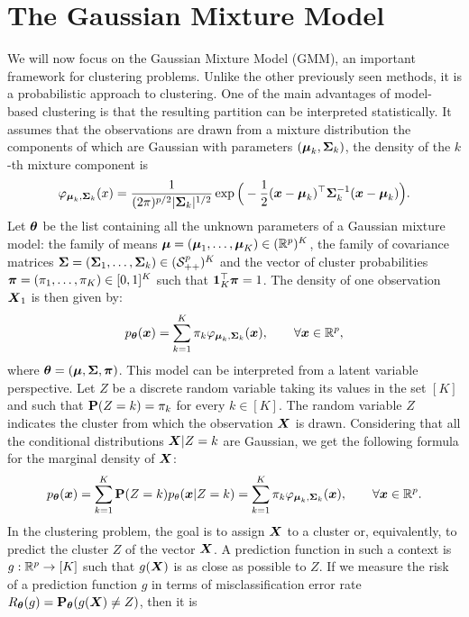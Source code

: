 \section{The Gaussian Mixture Model}
We will now focus on the Gaussian Mixture Model (GMM), an important framework for clustering problems. Unlike the other previously seen methods, it is a probabilistic approach to clustering. One of the main advantages of model-based clustering is that the resulting partition can be interpreted statistically. It assumes that the observations are drawn from a
mixture distribution the components of which are Gaussian  with parameters $(\boldsymbol\mu_k,\boldsymbol\Sigma_k)$, the density of the $k$-th mixture component is
\begin{equation}
\varphi_{\boldsymbol\mu_k,\boldsymbol\Sigma_k}(x)=\frac{1}{(2\pi)^{p/2}|\boldsymbol\Sigma_k|^{1/2}} \exp\Big(-\frac{1}{2}(\boldsymbol x-\boldsymbol\mu_k)^\top\boldsymbol\Sigma_k^{-1}(\boldsymbol x-\boldsymbol\mu_k)\Big).
\end{equation}
Let ${\boldsymbol\theta}$ be the list containing all the unknown parameters of a Gaussian mixture model: the family of means $\boldsymbol\mu = (\boldsymbol\mu_1,\ldots,\boldsymbol\mu_K)
\in ({\mathbb R}^p)^K$, the family of covariance matrices $\boldsymbol\Sigma = (\boldsymbol\Sigma_1,\ldots,\boldsymbol\Sigma_k)\in(\mathcal S_{++}^p)^K$ and the vector of cluster probabilities  $\boldsymbol \pi=(\pi_1,\ldots,\pi_K)\in [0,1]^K$ such that $\b1_K^\top\bpi=1$.
The density of one observation $\boldsymbol X_1$ is then given by:
\begin{equation}\label{mixture}
p_{{\boldsymbol\theta}}(\boldsymbol x)=\sum_{k=1}^K\pi_k\varphi_{\boldsymbol\mu_k,\boldsymbol\Sigma_k}(\boldsymbol x),\qquad \forall \boldsymbol x\in{\mathbb R}^p,
\end{equation}
where ${\boldsymbol\theta}=(\boldsymbol\mu,\boldsymbol\Sigma,\boldsymbol \pi)$.
This model can be interpreted from a latent variable perspective. Let $Z$ be a discrete random variable
taking its values in the set $[K]$ and such that $\mathbf P(Z=k) = \pi_k$ for every $k\in[K]$. The random variable $Z$
indicates the cluster from which the observation $\boldsymbol X$ is drawn.  Considering that all the conditional distributions
$\boldsymbol X|Z=k$ are Gaussian, we get the following formula for the marginal density of $\boldsymbol X$:
\begin{equation}
p_{{\boldsymbol\theta}}(\boldsymbol x)=\sum_{k=1}^K \mathbf P(Z=k)p_{\theta}(\boldsymbol x|Z=k) = \sum_{k=1}^K\pi_k\varphi_{\boldsymbol\mu_k,\boldsymbol\Sigma_k}(\boldsymbol x),\qquad \forall \boldsymbol x\in{\mathbb R}^p.
\end{equation}
In the clustering problem, the goal is to assign $\boldsymbol X$ to a cluster or, equivalently, to predict the cluster $Z$ of the vector $\boldsymbol X$.
A prediction function in such a context is $g:{\mathbb R}^p\to[K]$ such that $g(\boldsymbol X)$ is as close as possible to $Z$. If we measure the
risk of a prediction function $g$ in terms of misclassification error rate $R_{\boldsymbol\theta}(g) = \mathbf P_{\boldsymbol\theta}(g(\boldsymbol X)\not=Z)$, then it is
